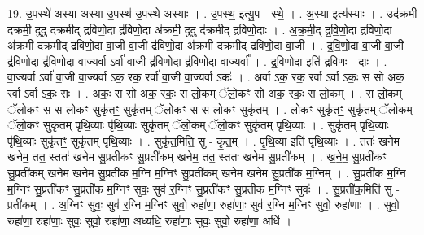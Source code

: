 \documentclass[17pt]{extarticle}
\begin{document}
19. उ॒पस्थे॑ अस्या अस्या उ॒पस्थ॑ उ॒पस्थे॑ अस्याः । . उ॒पस्थ॒ इत्यु॒प - स्थे॒ । . अ॒स्या इत्य॑स्याः । . उद॑क्रमी दक्रमी॒ दुदु द॑क्रमीद् द्रविणो॒दा द्र॑विणो॒दा अ॑क्रमी॒ दुदु द॑क्रमीद् द्रविणो॒दाः । . अ॒क्र॒मी॒द् द्र॒वि॒णो॒दा द्र॑विणो॒दा अ॑क्रमी दक्रमीद् द्रविणो॒दा वा॒जी वा॒जी द्र॑विणो॒दा अ॑क्रमी दक्रमीद् द्रविणो॒दा वा॒जी । . द्र॒वि॒णो॒दा वा॒जी वा॒जी द्र॑विणो॒दा द्र॑विणो॒दा वा॒ज्यर्वा ऽर्वा॑ वा॒जी द्र॑विणो॒दा द्र॑विणो॒दा वा॒ज्यर्वा᳚ । . द्र॒वि॒णो॒दा इति॑ द्रविणः - दाः । . वा॒ज्यर्वा ऽर्वा॑ वा॒जी वा॒ज्यर्वा ऽक॒ रक॒ रर्वा॑ वा॒जी वा॒ज्यर्वा ऽकः॑ । . अर्वा ऽक॒ रक॒ रर्वा ऽर्वा ऽकः॒ स सो अक॒ रर्वा ऽर्वा ऽकः॒ सः । . अकः॒ स सो अक॒ रकः॒ स लो॒कम् ॅलो॒कꣳ सो अक॒ रकः॒ स लो॒कम् । . स लो॒कम् ॅलो॒कꣳ स स लो॒कꣳ सुकृ॑तꣳ॒॒ सुकृ॑तम् ॅलो॒कꣳ स स लो॒कꣳ सुकृ॑तम् । . लो॒कꣳ सुकृ॑तꣳ॒॒ सुकृ॑तम् ॅलो॒कम् ॅलो॒कꣳ सुकृ॑तम् पृथि॒व्याः पृ॑थि॒व्याः सुकृ॑तम् ॅलो॒कम् ॅलो॒कꣳ सुकृ॑तम् पृथि॒व्याः । . सुकृ॑तम् पृथि॒व्याः पृ॑थि॒व्याः सुकृ॑तꣳ॒॒ सुकृ॑तम् पृथि॒व्याः । . सुकृ॑त॒मिति॒ सु - कृ॒त॒म् । . पृ॒थि॒व्या इति॑ पृथि॒व्याः । . ततः॑ खनेम खनेम॒ तत॒ स्ततः॑ खनेम सु॒प्रती॑कꣳ सु॒प्रती॑कम् खनेम॒ तत॒ स्ततः॑ खनेम सु॒प्रती॑कम् । . ख॒ने॒म॒ सु॒प्रती॑कꣳ सु॒प्रती॑कम् खनेम खनेम सु॒प्रती॑क म॒ग्नि म॒ग्निꣳ सु॒प्रती॑कम् खनेम खनेम सु॒प्रती॑क म॒ग्निम् । . सु॒प्रती॑क म॒ग्नि म॒ग्निꣳ सु॒प्रती॑कꣳ सु॒प्रती॑क म॒ग्निꣳ सुवः॒ सुव॑ र॒ग्निꣳ सु॒प्रती॑कꣳ सु॒प्रती॑क म॒ग्निꣳ सुवः॑ । . सु॒प्रती॑क॒मिति॑ सु - प्रती॑कम् । . अ॒ग्निꣳ सुवः॒ सुव॑ र॒ग्नि म॒ग्निꣳ सुवो॒ रुहा॑णा॒ रुहा॑णाः॒ सुव॑ र॒ग्नि म॒ग्निꣳ सुवो॒ रुहा॑णाः । . सुवो॒ रुहा॑णा॒ रुहा॑णाः॒ सुवः॒ सुवो॒ रुहा॑णा॒ अध्यधि॒ रुहा॑णाः॒ सुवः॒ सुवो॒ रुहा॑णा॒ अधि॑ । \newline
\end{document}
